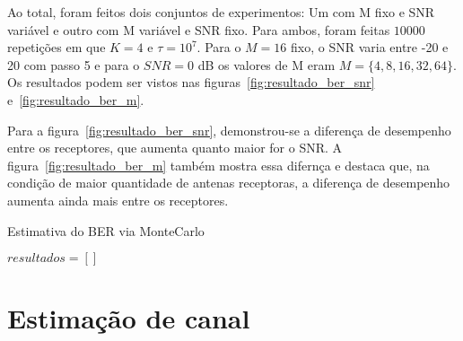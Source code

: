 \documentclass{article}
\begin{document}
Ao total, foram feitos dois conjuntos de experimentos: Um com M fixo e SNR variável e outro com M variável e SNR fixo. Para ambos, foram feitas $10000$ repetições em que $K=4$ e $\tau=10^7$. Para o $M=16$ fixo, o SNR varia entre -20 e 20 com passo 5 e para o $SNR = 0$ dB os valores de M eram $M=\{4,8,16,32,64\}$. Os resultados podem ser vistos nas figuras~\ref{fig:resultado_ber_snr} e~\ref{fig:resultado_ber_m}. 

Para a figura~\ref{fig:resultado_ber_snr}, demonstrou-se a diferença de desempenho entre os receptores, que aumenta quanto maior for o SNR. A figura~\ref{fig:resultado_ber_m} também mostra essa difernça e destaca que, na condição de maior quantidade de antenas receptoras, a diferença de desempenho aumenta ainda mais entre os receptores.

\begin{algorithm}
    \label{alg:ber_snr}
    \caption{Estimativa do BER via MonteCarlo}
    $resultados = []$
\end{algorithm}


\section{Estimação de canal}
\label{sec:estimacao_canal}
\end{document}
